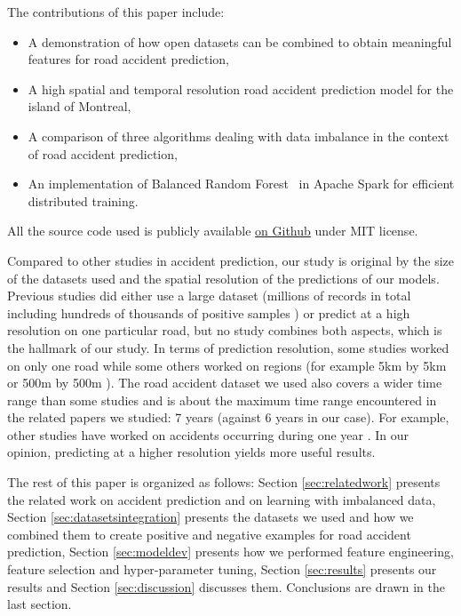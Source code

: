 \documentclass[conference]{IEEEtran}
\begin{document}
The contributions of this paper include: 
\begin{itemize}
\item A demonstration of how open datasets can be combined to obtain
meaningful features for road accident prediction,
\item A high spatial and temporal resolution road accident prediction model for the island of Montreal,
\item A comparison of three algorithms dealing with data imbalance in the context of road accident prediction,
\item An implementation of Balanced Random Forest~\cite{Chen2004} in Apache Spark for efficient distributed training.
\end{itemize}

All the source code used is publicly available \href{https://github.com/big-data-lab-team/accident-prediction-montreal}{on Github} under MIT license.

Compared to other studies in accident prediction, our study is original by the size of the datasets used and the spatial resolution of the predictions of our models. 
Previous studies did either use a large dataset (millions of records in total including hundreds of thousands of positive samples \cite{QChen2016}) or predict at a high resolution on one particular road, but no study combines both aspects, which is the hallmark of our study. In terms of prediction resolution, some studies worked on only one road \cite{Chang2005} \cite{Chang2005b} \cite{Lin2015} while some others worked on regions (for example 5km by 5km \cite{QChen2016} or 500m by 500m \cite{Yuan2018}). The road accident dataset we used also covers a wider time range than some studies and is about the maximum time range encountered in the related papers we studied: 7 years \cite{Yuan2018} (against 6 years in our case). For example, other studies have worked on accidents occurring during one year \cite{Chang2005} \cite{Chang2005b} \cite{QChen2016} \cite{Lin2015}. 
In our opinion, predicting at a higher resolution yields more useful results.

The rest of this paper is organized as follows: Section \ref{sec:relatedwork} presents
the related work on accident prediction and on learning with imbalanced data, Section \ref{sec:datasetsintegration} presents the datasets we used and
how we combined them to create positive and negative examples for road
accident prediction, Section \ref{sec:modeldev} presents how we performed feature
engineering, feature selection and hyper-parameter tuning, Section \ref{sec:results}
presents our results and Section \ref{sec:discussion} discusses them.
Conclusions are drawn in the last section.
\end{document}
